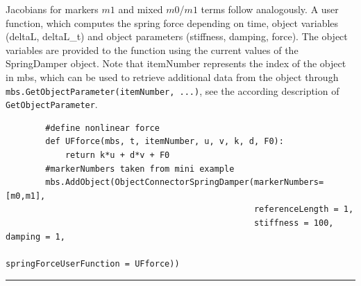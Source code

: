     Jacobians for markers $m1$ and mixed $m0$/$m1$ terms follow analogously.
    A user function, which computes the spring force depending on time, object variables (deltaL, deltaL\_t) and 
    object parameters (stiffness, damping, force).
    The object variables are provided to the function using the current values of the SpringDamper object.
    Note that itemNumber represents the index of the object in mbs, which can be used to retrieve additional data from the object through
    \texttt{mbs.GetObjectParameter(itemNumber, ...)}, see the according description of \texttt{GetObjectParameter}.
    \finishTable
    \userFunctionExample{}
    \pythonstyle\begin{lstlisting}
        #define nonlinear force
        def UFforce(mbs, t, itemNumber, u, v, k, d, F0): 
            return k*u + d*v + F0
        #markerNumbers taken from mini example
        mbs.AddObject(ObjectConnectorSpringDamper(markerNumbers=[m0,m1],
                                                  referenceLength = 1, 
                                                  stiffness = 100, damping = 1,
                                                  springForceUserFunction = UFforce))
    \end{lstlisting} \vspace{12pt}
\vspace{6pt}\par\noindent\rule{\textwidth}{0.4pt}
